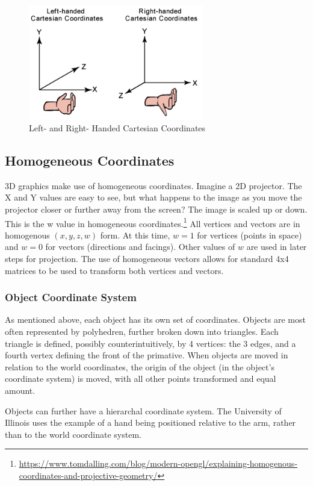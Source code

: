 \documentclass{article}
\begin{document}
\begin{figure}[H]
    \centering
    \includegraphics[width=3.0in]{leftrght.png}
    \caption{Left- and Right- Handed Cartesian Coordinates}
    \label{LeftRight}
\end{figure}

\subsection{Homogeneous Coordinates}
3D graphics make use of homogeneous coordinates. Imagine a 2D projector. The X and Y values are easy to see, but what happens to the image as you move the projector closer or further away from the screen? The image is scaled up or down. This is the w value in homogeneous coordinates.\footnote{\url{https://www.tomdalling.com/blog/modern-opengl/explaining-homogenous-coordinates-and-projective-geometry/}} All vertices and vectors are in homogenous $(x, y, z, w)$ form. At this time, $w = 1$ for vertices (points in space) and $w = 0$ for vectors (directions and facings). Other values of $w$ are used in later steps for projection. The use of homogeneous vectors allows for standard 4x4 matrices to be used to transform both vertices and vectors.

\subsubsection{Object Coordinate System}
As mentioned above, each object has its own set of coordinates. Objects are most often represented by polyhedren, further broken down into triangles. Each triangle is defined, possibly counterintuitively, by 4 vertices: the 3 edges, and a fourth vertex defining the front of the primative. When objects are moved in relation to the world coordinates, the origin of the object (in the object's coordinate system) is moved, with all other points transformed and equal amount.

Objects can further have a hierarchal coordinate system. The University of Illinois uses the example of a hand being positioned relative to the arm, rather than to the world coordinate system. 
\end{document}
